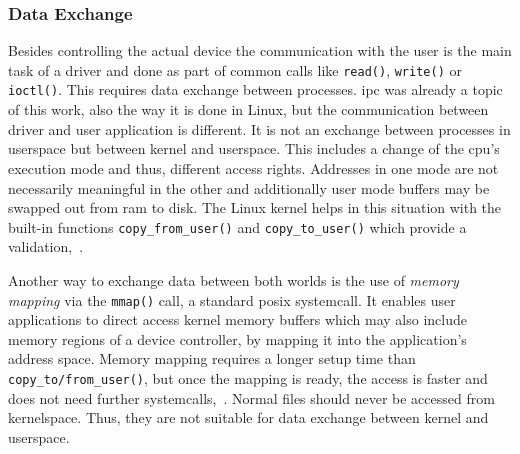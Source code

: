 \newpage
\subsubsection*{Data Exchange}
Besides controlling the actual device the communication with the user is the main task of a driver and done as part of common calls like \texttt{read()}, \texttt{write()} or \texttt{ioctl()}.
This requires data exchange between processes.
\ac{ipc} was already a topic of this work, also the way it is done in Linux, but the communication between driver and user application is different.
It is not an exchange between processes in userspace but between kernel and userspace.
This includes a change of the \ac{cpu}'s execution mode and thus, different access rights.
Addresses in one mode are not necessarily meaningful in the other and additionally user mode buffers may be swapped out from \ac{ram} to disk.
The Linux kernel helps in this situation with the built-in functions \texttt{copy\_from\_user()} and \texttt{copy\_to\_user()} which provide a validation\cite{lfd430},~\cite{glatz2015betriebssysteme}.

Another way to exchange data between both worlds is the use of \textit{memory mapping} via the \texttt{mmap()} call, a standard \ac{posix} systemcall.
It enables user applications to direct access kernel memory buffers which may also include memory regions of a device controller, by mapping it into the application's address space.
Memory mapping requires a longer setup time than \texttt{copy\_to/from\_user()}, but once the mapping is ready, the access is faster and does not need further systemcalls\cite{lfd430},~\cite{glatz2015betriebssysteme}.
Normal files should never be accessed from kernelspace.
Thus, they are not suitable for data exchange between kernel and userspace\cite{lfd430}.

